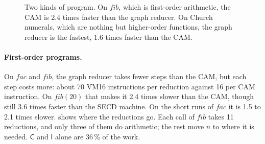 \documentclass[11pt,a4paper]{article}
\newcommand{\cmb}[1]{\textsf{#1}}
\newcommand{\I}{\cmb{I}}
\newcommand{\C}{\cmb{C}}
\theoremstyle{definition}
\theoremstyle{plain}
\begin{document}
\begin{figure}[t]
\centering
{}
\caption{Two kinds of program. On $\mathit{fib}$, which is first-order
arithmetic, the CAM is 2.4 times faster than the graph reducer. On Church
numerals, which are nothing but higher-order functions, the graph reducer is
the fastest, 1.6 times faster than the CAM.}
\label{fig:bars}
\end{figure}

\paragraph{First-order programs.} On $\mathit{fac}$ and $\mathit{fib}$, the
graph reducer takes fewer steps than the CAM, but each step costs more:
about 70 VM16 instructions per reduction against 16 per CAM instruction. On
$\mathit{fib}(20)$ that makes it 2.4 times slower than the CAM, though still
3.6 times faster than the SECD machine. On the short runs of $\mathit{fac}$
it is 1.5 to 2.1 times slower.  shows where the
reductions go. Each call of $\mathit{fib}$ takes 11 reductions, and only
three of them do arithmetic; the rest move $n$ to where it is needed. $\C$ and $\I$ alone are 36\,\% of the work.
\end{document}
